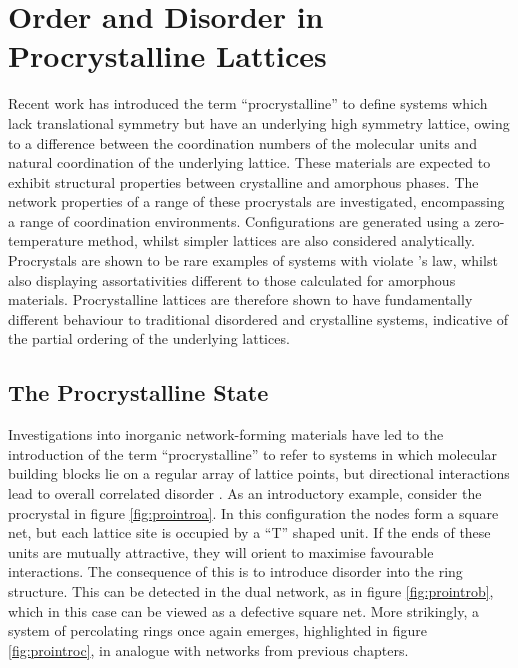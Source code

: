 \chapter[Order and Disorder in Procrystalline Lattices]{Order and Disorder in \\ Procrystalline Lattices} 

\begin{chapterabstract}
Recent work has introduced the term ``procrystalline'' to define systems which lack translational symmetry but have an underlying high symmetry lattice, owing to a difference between the coordination numbers of the molecular units and natural coordination of the underlying lattice.
These materials are expected to exhibit structural properties between crystalline and amorphous phases.
The network properties of a range of these procrystals are investigated, encompassing a range of coordination environments.
Configurations are generated using a zero\--temperature \mc{} method, whilst simpler lattices are also considered analytically.
Procrystals are shown to be rare examples of systems with violate \lm{}'s law, whilst also displaying assortativities different to those calculated for amorphous materials.
Procrystalline lattices are therefore shown to have fundamentally different behaviour to traditional disordered and crystalline systems, indicative of the partial ordering of the underlying lattices.
\end{chapterabstract}

\section{The Procrystalline State}

Investigations into inorganic network\--forming materials have led to the introduction of the term ``procrystalline'' to refer to systems in which molecular building blocks lie on a regular array of lattice points, but directional interactions lead to overall correlated disorder \cite{Overy2016}.
As an introductory example, consider the procrystal in figure \ref{fig:prointroa}.
In this configuration the nodes form a square net, but each lattice site is occupied by a ``T'' shaped unit.
If the ends of these units are mutually attractive, they will orient to maximise favourable interactions.
The consequence of this is to introduce disorder into the ring structure.
This can be detected in the dual network, as in figure \ref{fig:prointrob}, which in this case can be viewed as a defective square net.
More strikingly, a system of percolating rings once again emerges, highlighted in figure \ref{fig:prointroc}, in analogue with networks from previous chapters. 

